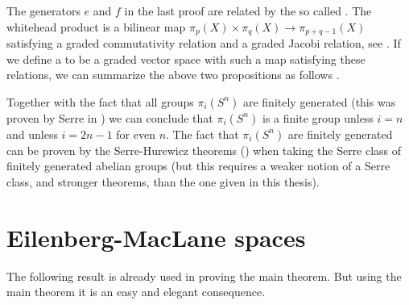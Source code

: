 The generators $e$ and $f$ in the last proof are related by the so called . The whitehead product is a bilinear map $\pi_p(X) \times \pi_q(X) \to \pi_{p+q-1}(X)$ satisfying a graded commutativity relation and a graded Jacobi relation, see \cite{felix}. If we define a  to be a graded vector space with such a map satisfying these relations, we can summarize the above two propositions as follows \cite{berglund}.


Together with the fact that all groups $\pi_i(S^n)$ are finitely generated (this was proven by Serre in \cite{serre}) we can conclude that $\pi_i(S^n)$ is a finite group unless $i=n$ and unless $i=2n-1$ for even $n$. The fact that $\pi_i(S^n)$ are finitely generated can be proven by the Serre-Hurewicz theorems () when taking the Serre class of finitely generated abelian groups (but this requires a weaker notion of a Serre class, and stronger theorems, than the one given in this thesis).


\section{Eilenberg-MacLane spaces}

The following result is already used in proving the main theorem. But using the main theorem it is an easy and elegant consequence.



